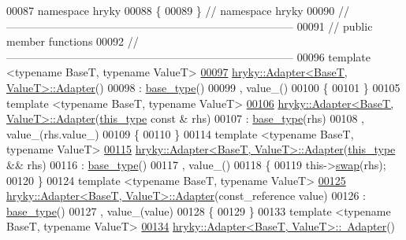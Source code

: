 \begin{DoxyCode}
00087 \textcolor{keyword}{namespace }hryky
00088 \{
00089 \} \textcolor{comment}{// namespace hryky}
00090 \textcolor{comment}{//
      ------------------------------------------------------------------------------}
00091 \textcolor{comment}{// public member functions}
00092 \textcolor{comment}{//
      ------------------------------------------------------------------------------}
00096 \textcolor{comment}{}\textcolor{keyword}{template} <\textcolor{keyword}{typename} BaseT, \textcolor{keyword}{typename} ValueT>
\hypertarget{adapter_8h_source_l00097}{}\hyperlink{classhryky_1_1_adapter_aad569390e8fc9963c8849cbd0c59bea9}{00097} \hyperlink{classhryky_1_1_adapter_aad569390e8fc9963c8849cbd0c59bea9}{hryky::Adapter<BaseT, ValueT>::Adapter}()
00098     : \hyperlink{classhryky_1_1_adapter_a577d587d418b924d5d57f80b21d3e3cb}{base_type}()
00099       , value\_()
00100 \{
00101 \}
00105 \textcolor{keyword}{template} <\textcolor{keyword}{typename} BaseT, \textcolor{keyword}{typename} ValueT>
\hypertarget{adapter_8h_source_l00106}{}\hyperlink{classhryky_1_1_adapter_a97e07e29367512fa16eae5d11a0792b9}{00106} \hyperlink{classhryky_1_1_adapter}{hryky::Adapter<BaseT, ValueT>::Adapter}(\hyperlink{classhryky_1_1_adapter}{this_type} \textcolor{keyword}{const} & rhs)
00107     : \hyperlink{classhryky_1_1_adapter_a577d587d418b924d5d57f80b21d3e3cb}{base_type}(rhs)
00108       , value\_(rhs.value\_)
00109 \{
00110 \}
00114 \textcolor{keyword}{template} <\textcolor{keyword}{typename} BaseT, \textcolor{keyword}{typename} ValueT>
\hypertarget{adapter_8h_source_l00115}{}\hyperlink{classhryky_1_1_adapter_ae96aec043d63145d978b24539332ffe4}{00115} \hyperlink{classhryky_1_1_adapter}{hryky::Adapter<BaseT, ValueT>::Adapter}(\hyperlink{classhryky_1_1_adapter}{this_type} && rhs)
00116     : \hyperlink{classhryky_1_1_adapter_a577d587d418b924d5d57f80b21d3e3cb}{base_type}()
00117       , value\_()
00118 \{
00119     this->\hyperlink{classhryky_1_1_adapter_ae95517793bc16f6ba623bc994bc17c43}{swap}(rhs);
00120 \}
00124 \textcolor{keyword}{template} <\textcolor{keyword}{typename} BaseT, \textcolor{keyword}{typename} ValueT>
\hypertarget{adapter_8h_source_l00125}{}\hyperlink{classhryky_1_1_adapter_ae2ef0abef88ed5d5b807b66af55a0b94}{00125} \hyperlink{classhryky_1_1_adapter}{hryky::Adapter<BaseT, ValueT>::Adapter}(const\_reference value)
00126     : \hyperlink{classhryky_1_1_adapter_a577d587d418b924d5d57f80b21d3e3cb}{base_type}()
00127       , value\_(value)
00128 \{
00129 \}
00133 \textcolor{keyword}{template} <\textcolor{keyword}{typename} BaseT, \textcolor{keyword}{typename} ValueT>
\hypertarget{adapter_8h_source_l00134}{}\hyperlink{classhryky_1_1_adapter_ade755ad9d00ac8263162ef6918db68c9}{00134} \hyperlink{classhryky_1_1_adapter}{hryky::Adapter<BaseT, ValueT>::~Adapter}()

\end{DoxyCode}
